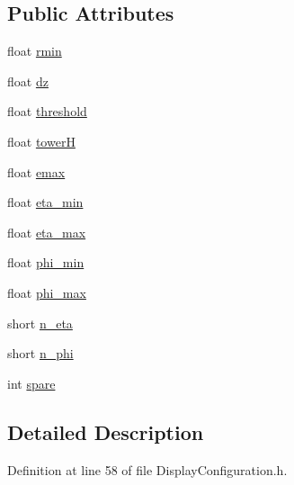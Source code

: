 \subsection*{Public Attributes}
\begin{DoxyCompactItemize}
\item 
float \hyperlink{struct_d_d4hep_1_1_display_configuration_1_1_calodata_ad66aad4f3af180d086d38e843e85aacf}{rmin}
\item 
float \hyperlink{struct_d_d4hep_1_1_display_configuration_1_1_calodata_add8df58585b1231290a12e7da2f2621f}{dz}
\item 
float \hyperlink{struct_d_d4hep_1_1_display_configuration_1_1_calodata_a83c052550585418a3f64e5b1b34d5d76}{threshold}
\item 
float \hyperlink{struct_d_d4hep_1_1_display_configuration_1_1_calodata_a9b1ac13cbc2a38b0b9fed9d8d431060c}{towerH}
\item 
float \hyperlink{struct_d_d4hep_1_1_display_configuration_1_1_calodata_a471e0a91b9b45ba9b9917e1ef6d0bba8}{emax}
\item 
float \hyperlink{struct_d_d4hep_1_1_display_configuration_1_1_calodata_a9a610caa053f259f21ee4051de9c7160}{eta\+\_\+min}
\item 
float \hyperlink{struct_d_d4hep_1_1_display_configuration_1_1_calodata_ac4cd456a1e2d56e753b3c298f1c864b0}{eta\+\_\+max}
\item 
float \hyperlink{struct_d_d4hep_1_1_display_configuration_1_1_calodata_ab35d557de81c5fe8dbfecefda9e83cfb}{phi\+\_\+min}
\item 
float \hyperlink{struct_d_d4hep_1_1_display_configuration_1_1_calodata_ae0666a2af1e429c873b335c99545ad21}{phi\+\_\+max}
\item 
short \hyperlink{struct_d_d4hep_1_1_display_configuration_1_1_calodata_a0f4545d6efc01e1496fafdd925a4bdcd}{n\+\_\+eta}
\item 
short \hyperlink{struct_d_d4hep_1_1_display_configuration_1_1_calodata_a30fd6c2e98b91f76c020d803c0cf10fd}{n\+\_\+phi}
\item 
int \hyperlink{struct_d_d4hep_1_1_display_configuration_1_1_calodata_abda3e84b84be3024b62145411f0f125e}{spare}
\end{DoxyCompactItemize}


\subsection{Detailed Description}


Definition at line 58 of file Display\+Configuration.\+h.



